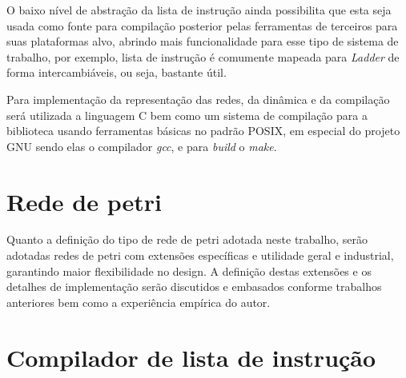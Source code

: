 O baixo nível de abstração da lista de instrução ainda possibilita que esta seja usada como fonte para compilação posterior pelas ferramentas de terceiros para suas plataformas alvo, abrindo mais funcionalidade para esse tipo de sistema de trabalho, por exemplo, lista de instrução é comumente mapeada para \textit{Ladder} de forma intercambiáveis, ou seja, bastante útil.

Para implementação da representação das redes, da dinâmica e da compilação será utilizada a linguagem C bem como um sistema de compilação para a biblioteca usando ferramentas básicas no padrão POSIX\nocite{posix}, em especial do projeto GNU \cite{gnu} sendo elas o compilador \textit{gcc}, e para \textit{build} o \textit{make}.




\section{Rede de petri}

Quanto a definição do tipo de rede de petri adotada neste trabalho, serão adotadas redes de petri com extensões específicas e utilidade geral e industrial, garantindo maior flexibilidade no design. A definição destas extensões e os detalhes de implementação serão discutidos e embasados conforme trabalhos anteriores bem como a experiência empírica do autor.

\section{Compilador de lista de instrução}

